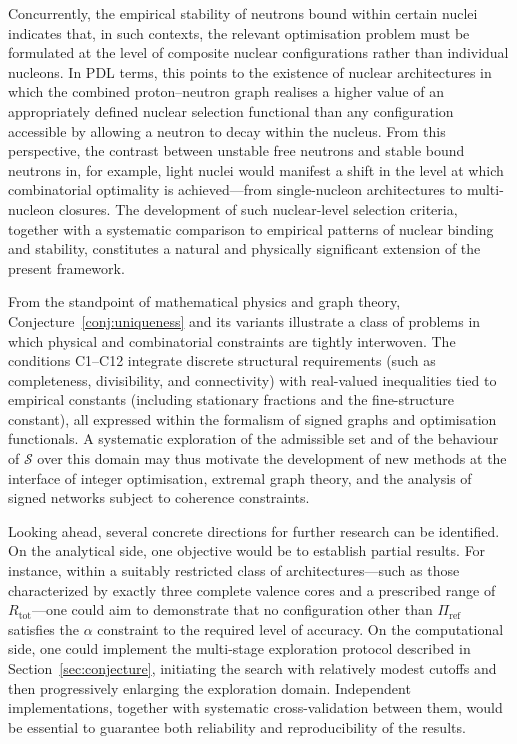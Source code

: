 \documentclass[11pt,a4paper]{article}
\begin{document}
Concurrently, the empirical stability of neutrons bound within certain nuclei indicates that, in such contexts, the relevant optimisation problem must be formulated at the level of composite nuclear configurations rather than individual nucleons. In PDL terms, this points to the existence of nuclear architectures in which the combined proton–neutron graph realises a higher value of an appropriately defined nuclear selection functional than any configuration accessible by allowing a neutron to decay within the nucleus. From this perspective, the contrast between unstable free neutrons and stable bound neutrons in, for example, light nuclei would manifest a shift in the level at which combinatorial optimality is achieved—from single-nucleon architectures to multi-nucleon closures. The development of such nuclear-level selection criteria, together with a systematic comparison to empirical patterns of nuclear binding and stability, constitutes a natural and physically significant extension of the present framework.

From the standpoint of mathematical physics and graph theory, Conjecture~\ref{conj:uniqueness} and its variants illustrate a class of problems in which physical and combinatorial constraints are tightly interwoven. The conditions C1–C12 integrate discrete structural requirements (such as completeness, divisibility, and connectivity) with real-valued inequalities tied to empirical constants (including stationary fractions and the fine-structure constant), all expressed within the formalism of signed graphs and optimisation functionals.\cite{LaubscherIntroPDL2026,LaubscherPDLFull2026} A systematic exploration of the admissible set and of the behaviour of $\mathcal{S}$ over this domain may thus motivate the development of new methods at the interface of integer optimisation, extremal graph theory, and the analysis of signed networks subject to coherence constraints.

Looking ahead, several concrete directions for further research can be identified. On the analytical side, one objective would be to establish partial results. For instance, within a suitably restricted class of architectures—such as those characterized by exactly three complete valence cores and a prescribed range of $R_{\mathrm{tot}}$—one could aim to demonstrate that no configuration other than $\Pi_{\mathrm{ref}}$ satisfies the $\alpha$ constraint to the required level of accuracy. On the computational side, one could implement the multi-stage exploration protocol described in Section~\ref{sec:conjecture}, initiating the search with relatively modest cutoffs and then progressively enlarging the exploration domain. Independent implementations, together with systematic cross-validation between them, would be essential to guarantee both reliability and reproducibility of the results.
\end{document}
